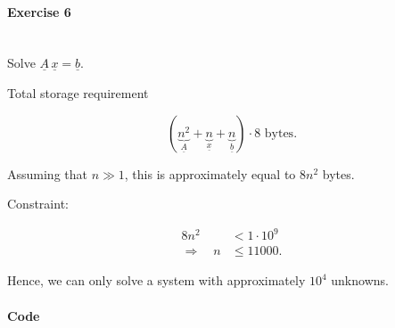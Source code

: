 \documentclass[11pt]{article}
\begin{document}
\paragraph{Exercise 6} \ \\
Solve $\underline{A} \, \underline{x} = \underline{b}$.

Total storage requirement

\begin{equation*}
  (\underset{\underline{A}}{\underbrace{n^2}}+\underset{\underline{x}}{\underbrace{n}}+\underset{\underline{b}}{\underbrace{n}}) \cdot 8 \text{ bytes}.
\end{equation*}

Assuming that $n \gg 1$, this is approximately equal to $8 n^2$ bytes.

Constraint:

\begin{align*}
  8 n^2 &< 1 \cdot 10^9 \\
  \Rightarrow \quad n &\leq 11000.
\end{align*}

Hence, we can only solve a system with approximately $10^4$ unknowns.

\newpage
\paragraph{Code} \ \\

\end{document}
